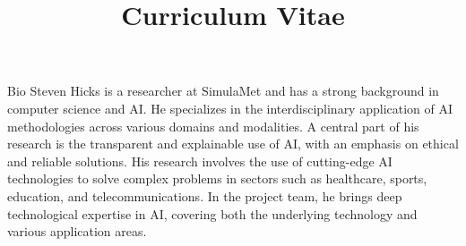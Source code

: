 \documentclass[a4paper,skipsamekey,10pt,english]{curve}
\title{Curriculum Vitae}
\begin{document}
\makeheaders[c]

\begin{rubric}{Bio}
\entry*[] Steven Hicks is a researcher at SimulaMet and has a strong background in computer science and AI. He specializes in the interdisciplinary application of AI methodologies across various domains and modalities. A central part of his research is the transparent and explainable use of AI, with an emphasis on ethical and reliable solutions. His research involves the use of cutting-edge AI technologies to solve complex problems in sectors such as healthcare, sports, education, and telecommunications. In the project team, he brings deep technological expertise in AI, covering both the underlying technology and various application areas.
\end{rubric}
\end{document}
